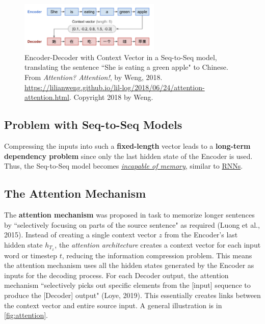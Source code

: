 \begin{figure}[h]
\vspace{-5pt}
\centering
\includegraphics[width=0.6\textwidth]{imgs/seqtoseq_greenapple.png}
\vspace{-5pt}
\caption{\footnotesize Encoder-Decoder with Context Vector in a Seq-to-Seq model, translating the sentence ``She is eating a green apple" to Chinese. From \emph{Attention? Attention!}, by Weng, 2018. \url{https://lilianweng.github.io/lil-log/2018/06/24/attention-attention.html}. Copyright 2018 by Weng.}
\vspace{-5pt}
\end{figure}


\subsection{Problem with Seq-to-Seq Models} \label{sec:ProblemWithSeq2Seq}

Compressing the inputs into such a \textbf{fixed-length} vector leads to a \textbf{long-term dependency problem} since only the last hidden state of the Encoder is used. Thus, the Seq-to-Seq model becomes \textit{\hyperref[sec:ProblemWithRNNs]{incapable of memory}}, similar to  \hyperref[sec:RNN]{RNNs}.

\subsection{The Attention Mechanism} \label{sec:AttentionMechanism}

The \textbf{attention mechanism} was proposed in  task to memorize longer sentences by ``selectively focusing on parts of the source sentence" as required (Luong et al., 2015). Instead of creating a single context vector $z$ from the Encoder's last hidden state $h_{T_x}$, the \emph{attention architecture} creates a context vector for each input word or timestep $t$, reducing the information compression problem. This means the attention mechanism uses all the hidden states generated by the Encoder as inputs for the decoding process. For each Decoder output, the attention mechanism ``selectively picks out specific elements from the [input] sequence to produce the [Decoder] output" (Loye, 2019). This essentially creates links between the context vector and entire source input. A general illustration is in \cref{fig:attention}.

